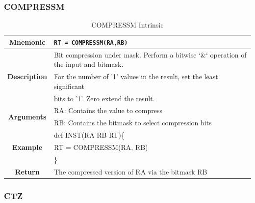 \documentclass{article}
\begin{document}
\clearpage
\subsubsection{COMPRESSM}
\label{sec:COMPRESSM}

\begin{table}[h]
\begin{center}
\caption{COMPRESSM Intrinsic}
\vspace{0.125in}
\label{tab:COMPRESSMIntrinsic}
\begin{tabular}{|c|l|}
\hline
\textbf{Mnemonic} & \texttt{RT = COMPRESSM(RA,RB)}\\
\hline
\multirow{3}{*}{\textbf{Description}} & Bit compression under mask.  Perform a bitwise `\&` operation of the input and bitmask. \\
						      & For the number of '1' values in the result, set the least significant \\
						      & bits to '1'.  Zero extend the result.\\
\hline
\multirow{2}{*}{\textbf{Arguments}} & RA: Contains the value to compress\\
                          			     & RB: Contains the bitmask to select compression bits \\
\hline
\multirow{3}{*}{\textbf{Example}} & def INST(RA RB RT)\{\\
                          			  &   RT = COMPRESSM(RA, RB)\\
                                                    & \}\\
\hline
\textbf{Return} & The compressed version of RA via the bitmask RB\\                                                    
\hline
\end{tabular}
\end{center}
\end{table}

\clearpage
\subsubsection{CTZ}
\label{sec:CTZ}
\end{document}
